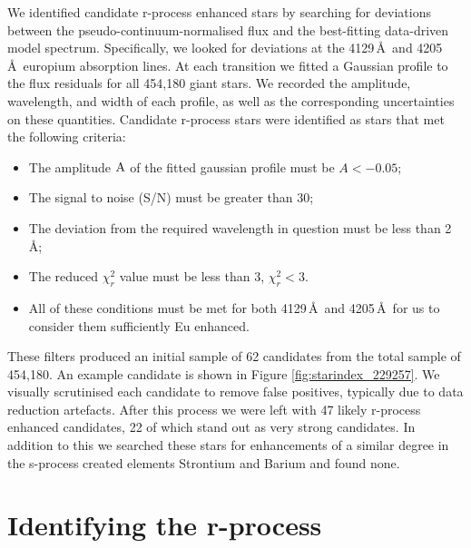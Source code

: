 \documentclass[a4paper,fleqn,usenatbib]{mnras}
\begin{document}
	We identified candidate r-process enhanced stars by searching for deviations between the pseudo-continuum-normalised flux and the best-fitting data-driven model spectrum. Specifically, we looked for deviations at the 4129\,\AA\ and 4205\,\AA\ europium absorption lines. At each transition we fitted a Gaussian profile to the flux residuals for all 454,180 giant stars. We recorded the amplitude, wavelength, and width of each profile, as well as the corresponding uncertainties on these quantities. 
	Candidate r-process stars were identified as stars that met the following criteria:
	
	\begin{itemize}
		\item The amplitude $\rm{A}$ of the fitted gaussian profile must be ${A<-0.05}$;
		\item The signal to noise (S/N) must be greater than 30;
		\item The deviation from the required wavelength in question must be less than 2\,\AA;
		\item The reduced $\chi_r^{2}$ value must be less than 3, $\chi_r^{2}<3$.
		\item All of these conditions must be met for both 4129\,\AA\ and 4205\,\AA\ for us to consider them sufficiently Eu enhanced.
	\end{itemize}   
	
	These filters produced an initial sample of 62 candidates from the total sample of 454,180. An example candidate is shown in Figure \ref{fig:starindex_229257}. We visually scrutinised each candidate to remove false positives, typically due to data reduction artefacts. After this process we were left with 47 likely r-process enhanced candidates, 22 of which stand out as very strong candidates. In addition to this we searched these stars for enhancements of a similar degree in the s-process created elements Strontium and Barium and found none. 
	
	\section{Identifying the r-process}
	
\end{document}
